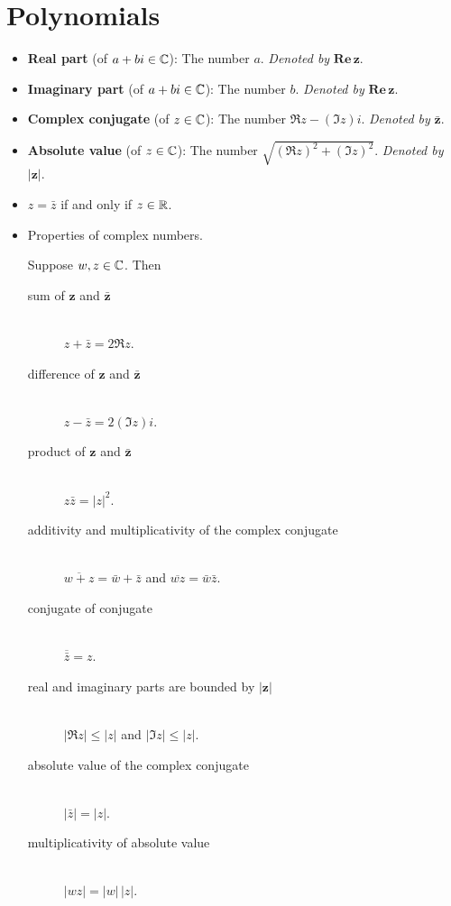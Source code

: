 \documentclass[../main.tex]{subfiles}
\begin{document}
\chapter{Polynomials}
\begin{itemize}
    \item {}\textbf{Real part} (of $a+bi\in\mathbb{C}$): The number $a$. \emph{Denoted by} $\mathbf{Re}\,\bm{z}$.
    \item \textbf{Imaginary part} (of $a+bi\in\mathbb{C}$): The number $b$. \emph{Denoted by} $\mathbf{Re}\,\bm{z}$.
    \item \textbf{Complex conjugate} (of $z\in\mathbb{C}$): The number $\Re z-(\Im z)i$. \emph{Denoted by} $\bm{\bar{z}}$.
    \item \textbf{Absolute value} (of $z\in\mathbb{C}$): The number $\sqrt{(\Re z)^2+(\Im z)^2}$. \emph{Denoted by} $\bm{|z|}$.
    \item $z=\bar{z}$ if and only if $z\in\mathbb{R}$.
    \item Properties of complex numbers.
    \begin{theorem}\label{trm:propertiesComplex}
        Suppose $w,z\in\mathbb{C}$. Then
        \begin{description}
            \item[sum of $\bm{z}$ and $\bm{\bar{z}}$]\hfill\\ $z+\bar{z}=2\Re z$.
            \item[difference of $\bm{z}$ and $\bm{\bar{z}}$]\hfill\\ $z-\bar{z}=2(\Im z)i$.
            \item[product of $\bm{z}$ and $\bm{\bar{z}}$]\hfill\\ $z\bar{z}=|z|^2$.
            \item[additivity and multiplicativity of the complex conjugate]\hfill\\ $\overline{w+z}=\bar{w}+\bar{z}$ and $\overline{wz}=\bar{w}\bar{z}$.
            \item[conjugate of conjugate]\hfill\\ $\overline{\bar{z}}=z$.
            \item[real and imaginary parts are bounded by $\bm{|z|}$]\hfill\\ $|\Re z|\leq|z|$ and $|\Im z|\leq|z|$.
            \item[absolute value of the complex conjugate]\hfill\\ $|\bar{z}|=|z|$.
            \item[multiplicativity of absolute value]\hfill\\ $|wz|=|w|\,|z|$.

\end{description}
\end{theorem}
\end{itemize}
\end{document}
